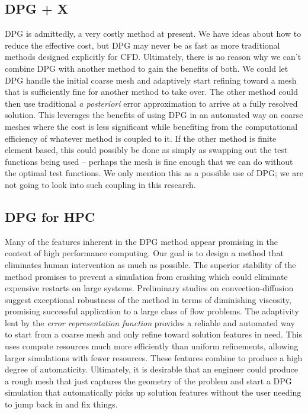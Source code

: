 \documentclass[Dissertation.tex]{subfiles}
\begin{document}
\subsection{DPG + X}
DPG is admittedly, a very costly method at present.
We have ideas about how to reduce the effective cost, but DPG may never be as fast as more traditional methods designed explicitly for CFD.
Ultimately, there is no reason why we can't combine DPG with another method to gain the benefits of both.
We could let DPG handle the initial coarse mesh and adaptively start refining toward a mesh that is sufficiently fine for another method to take over.
The other method could then use traditional \emph{a posteriori} error approximation to arrive at a fully resolved solution.
This leverages the benefits of using DPG in an automated way on coarse meshes where the cost is less significant while benefiting from the
computational efficiency of whatever method is coupled to it.
If the other method is finite element based, this could possibly be done as simply as swapping out the test functions being used
-- perhaps the mesh is fine enough that we can do without the optimal test functions.
We only mention this as a possible use of DPG; we are not going to look into such coupling in this research.

\subsection{DPG for HPC}
Many of the features inherent in the DPG method appear promising in the context of high performance computing.
Our goal is to design a method that eliminates human intervention as much as possible.
The superior stability of the method promises to prevent a simulation from crashing which could eliminate expensive restarts on large systems.
Preliminary studies on convection-diffusion suggest exceptional robustness of the method in terms of diminishing viscosity, 
promising successful application to a large class of flow problems.
The adaptivity lent by the \emph{error representation function} provides a reliable and automated way to start from a coarse mesh and only refine
toward solution features in need. 
This uses compute resources much more efficiently than uniform refinements, allowing larger simulations with fewer resources.
These features combine to produce a high degree of automaticity.
Ultimately, it is desirable that an engineer could produce a rough mesh that just captures the geometry of the problem and
start a DPG simulation that automatically picks up solution features without the user needing to jump back in and fix things.
\end{document}
